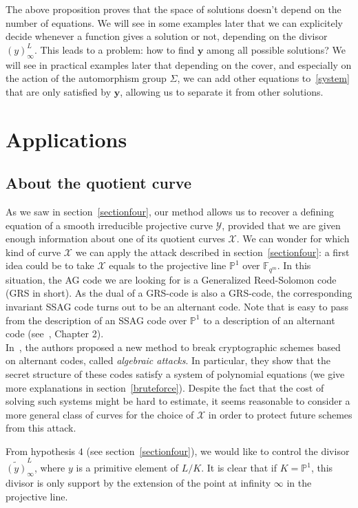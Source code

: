 \documentclass[10pt]{article}
\theoremstyle{definition}
\theoremstyle{definition}
\theoremstyle{definition}
\newcommand{\PP}{\mathbb{P}}
\newcommand{\Fqm}{\mathbb{F}_{q^m}}
\newcommand{\X}{\mathcal{X}}
\newcommand{\Y}{\mathcal{Y}}
\begin{document}
The above proposition proves that the space of solutions doesn't depend on the number of equations. 
We will see in some examples later that we can explicitely decide whenever a function gives a solution or not, depending on the divisor $(y)^L_{\infty}$. This leads to a problem: how to find $\mathbf{y}$ among all possible solutions? We will see in practical examples later that depending on the cover, and especially on the action of the automorphism group $\Sigma$,  we can add other equations to~\eqref{system} that are only satisfied by $\mathbf{y}$, allowing us to separate it from other solutions.

\section{Applications}


\subsection{About the quotient curve}

As we saw in section~\ref{sectionfour}, our method allows us to recover a defining equation of a smooth irreducible projective curve $\Y$, provided that we are given enough information about one of its quotient curves $\X$. We can wonder for which kind of curve $\X$ we can apply the attack described in section~\ref{sectionfour}: a first idea could be to take $\X$ equals to the projective line $\PP^1$ over $\Fqm$.
In this situation, the AG code we are looking for is a Generalized Reed-Solomon code (GRS in short). As the dual of a GRS-code is also a GRS-code, the corresponding invariant SSAG code turns out to be an alternant code. Note that is easy to pass from the description of an SSAG code over $\PP^1$ to a description of an alternant code (see~\cite{Sti}, Chapter 2). \\
In~\cite{FOP2}, the authors proposed a new method to break cryptographic schemes based on alternant codes, called \emph{algebraic attacks}. In particular, they show that the secret structure of these codes satisfy a system of polynomial equations (we give more explanations in section~\ref{bruteforce}). Despite the fact that the cost of solving such systems might be hard to estimate, it seems reasonable to consider a more general class of curves for the choice of $\X$ in order to protect future schemes from this attack.


From hypothesis $4$ (see section~\ref{sectionfour}), we would like to control the divisor $\widetilde{(y)}^L_{\infty}$, where $y$ is a primitive element of $L/K$. It is clear that if $K=\PP^1$, this divisor is only support by the extension of the point at infinity $\infty$ in the projective line. 
\end{document}
